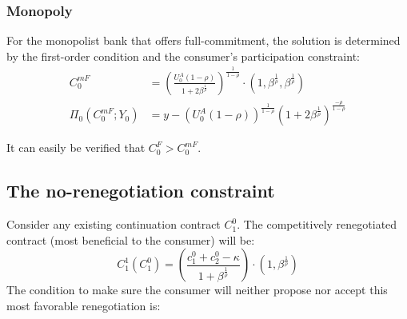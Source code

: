 \documentclass[11pt,english]{article}
\theoremstyle{plain}
\theoremstyle{definition}
\begin{document}
\subsubsection{Monopoly}

For the monopolist bank that offers full-commitment, the solution
is determined by the first-order condition and the consumer's participation
constraint: 
\begin{align}
C_{0}^{mF} & =\left(\frac{U_{0}^{A}\left(1-\rho\right)}{1+2\beta^{\frac{1}{\rho}}}\right)^{\frac{1}{1-\rho}}\cdot\left(1,\beta^{\frac{1}{\rho}},\beta^{\frac{1}{\rho}}\right)\label{eq:c-mf}\\
\Pi_{0}\left(C_{0}^{mF};Y_{0}\right) & =y-\left(U_{0}^{A}\left(1-\rho\right)\right)^{\frac{1}{1-\rho}}\left(1+2\beta^{\frac{1}{\rho}}\right)^{\frac{-\rho}{1-\rho}}\label{eq:pi-mf}
\end{align}

It can easily be verified that $C_{0}^{F}>C_{0}^{mF}$.

\subsection{The no-renegotiation constraint }

Consider any existing continuation contract $C_{1}^{0}$. The competitively
renegotiated contract (most beneficial to the consumer) will be: 
\begin{equation}
C_{1}^{1}\left(C_{1}^{0}\right)=\left(\frac{c_{1}^{0}+c_{2}^{0}-\kappa}{1+\beta^{\frac{1}{\rho}}}\right)\cdot\left(1,\beta^{\frac{1}{\rho}}\right)\label{eq:c-r}
\end{equation}
The condition to make sure the consumer will neither propose nor accept
this most favorable renegotiation is:
\end{document}
